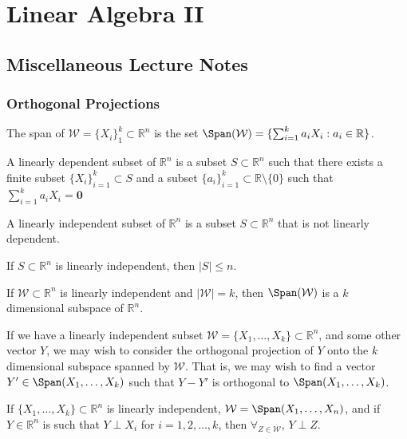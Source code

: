\documentclass[crop=false,class=book]{standalone}
\begin{document}
\chapter{Linear Algebra II}
\section{Miscellaneous Lecture Notes}
\subsection{Orthogonal Projections}
\begin{definition}
The span of $\mathcal{W}=\{X_{i}\}_{1}^{k} \subset \mathbb{R}^n$ is the set $\Span(\mathcal{W})=\{\sum_{i=1}^{k} a_i X_i: a_i \in \mathbb{R}\}$.
\end{definition}
\begin{definition}
A linearly dependent subset of $\mathbb{R}^{n}$ is a subset $S\subset\mathbb{R}^{n}$ such that there exists a finite subset $\{X_{i}\}_{i=1}^{k}\subset S$ and a subset $\{a_{i}\}_{i=1}^{k}\subset \mathbb{R}\setminus \{0\}$ such that $\sum_{i=1}^{k}a_{i}X_{i}=\mathbf{0}$
\end{definition}
\begin{definition}
A linearly independent subset of $\mathbb{R}^{n}$ is a subset $S\subset \mathbb{R}^{n}$ that is not linearly dependent.
\end{definition}
\begin{theorem}
If $S\subset\mathbb{R}^{n}$ is linearly independent, then $|S|\leq n$.
\end{theorem}
\begin{theorem}
If $\mathcal{W}\subset\mathbb{R}^{n}$ is linearly independent and $|\mathcal{W}| = k$, then $\Span(\mathcal{W})$ is a $k$ dimensional subspace of $\mathbb{R}^n$.
\end{theorem}
If we have a linearly independent subset $\mathcal{W}=\{X_1,\hdots, X_k\}\subset\mathbb{R}^n$, and some other vector $Y$, we may wish to consider the orthogonal projection of $Y$ onto the $k$ dimensional subspace spanned by $\mathcal{W}$. That is, we may wish to find a vector $Y'\in\Span(X_1,\hdots, X_k)$ such that $Y-Y'$ is orthogonal to $\Span(X_1,\hdots, X_k)$.
\begin{theorem}
If $\{X_1,\hdots, X_k\}\subset\mathbb{R}^n$ is linearly independent, $\mathcal{W} = \Span(X_1,\hdots, X_n)$, and if $Y\in \mathbb{R}^n$ is such that $Y\perp X_i$ for $i=1,2,\hdots, k$, then $\forall_{Z\in \mathcal{W}}$, $Y\perp Z$.
\end{theorem}
\end{document}
